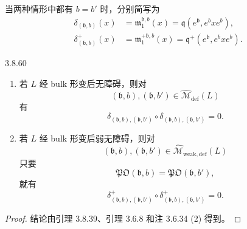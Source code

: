 当两种情形中都有 $b=b'$ 时，分别简写为
\[
\begin{aligned}
 \delta_{(\mathfrak b,b)}(x)
 &=
 \mathfrak m_1^{\mathfrak b,b}(x)
 =
 \mathfrak q(e^{\mathfrak b},e^bxe^b),\\
 \delta^+_{(\mathfrak b,b)}(x)
 &=
 \mathfrak m_1^{+\mathfrak b,b}(x)
 =
 \mathfrak q^+(e^{\mathfrak b},e^bxe^b).
\end{aligned}
\]

\begin{lemma}{3.8.60}\label{lem:3-8-60}
\begin{enumerate}[label=\textup{(\arabic*)},leftmargin=2.8em]
\item 若 $L$ 经 bulk 形变后无障碍，则对
\[
 (\mathfrak b,b),(\mathfrak b,b')
 \in\widehat{\mathcal M}_{\mathrm{def}}(L)
\]
有
\[
 \delta_{(\mathfrak b,b),(\mathfrak b,b')}
 \circ
 \delta_{(\mathfrak b,b),(\mathfrak b,b')}
 =0.
\]

\item 若 $L$ 经 bulk 形变后弱无障碍，则对
\[
 (\mathfrak b,b),(\mathfrak b,b')
 \in\widehat{\mathcal M}_{\mathrm{weak,def}}(L)
\]
只要
\[
 \mathfrak{PO}(\mathfrak b,b)
 =
 \mathfrak{PO}(\mathfrak b,b'),
\]
就有
\[
 \delta^+_{(\mathfrak b,b),(\mathfrak b,b')}
 \circ
 \delta^+_{(\mathfrak b,b),(\mathfrak b,b')}
 =0.
\]
\end{enumerate}
\end{lemma}

\begin{proof}
结论由引理 3.8.39、引理 3.6.8 和注 3.6.34 (2) 得到。
\end{proof}

